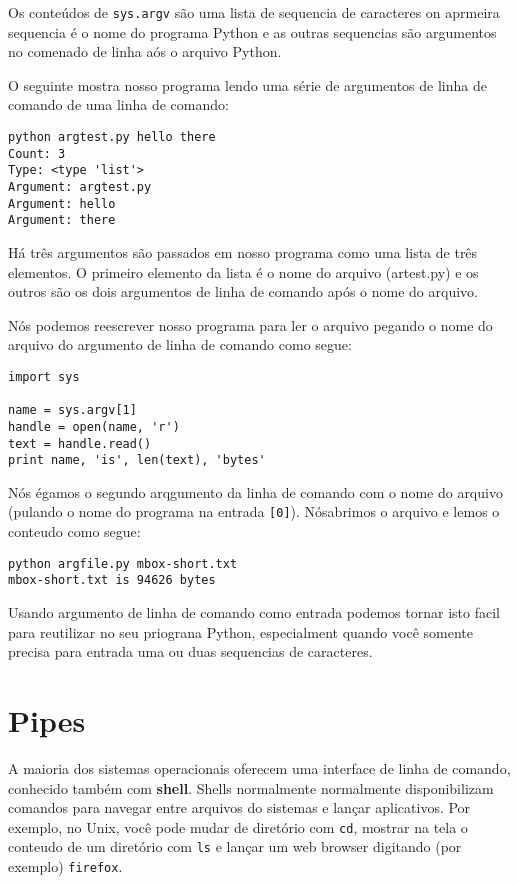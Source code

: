 \documentclass{book}
\begin{document}
%

Os conteúdos de {\tt sys.argv} são uma lista de sequencia de caracteres on aprmeira sequencia 
é o nome do programa Python e as outras sequencias são argumentos no comenado de linha aós o arquivo Python.

O seguinte mostra nosso programa lendo uma série de argumentos de linha de comando de uma linha de comando:

\begin{verbatim}
python argtest.py hello there
Count: 3
Type: <type 'list'>
Argument: argtest.py
Argument: hello
Argument: there
\end{verbatim}
%

Há três argumentos são passados em nosso programa como uma lista de três elementos. 
O primeiro elemento da lista é o nome do arquivo (artest.py) e os outros são
os dois argumentos de linha de comando após o nome do arquivo.

Nós podemos reescrever nosso programa para ler o arquivo pegando o nome do arquivo
do argumento de linha de comando como segue:

\begin{verbatim}
import sys

name = sys.argv[1]
handle = open(name, 'r')
text = handle.read()
print name, 'is', len(text), 'bytes'
\end{verbatim}

%
Nós égamos o segundo arqgumento da linha de comando com o nome do arquivo (pulando o nome do programa na entrada  {\tt [0]}).
Nósabrimos o arquivo e lemos o conteudo como segue:

\begin{verbatim}
python argfile.py mbox-short.txt
mbox-short.txt is 94626 bytes
\end{verbatim}

%
Usando argumento de linha de comando como entrada podemos tornar isto facil para reutilizar no seu priograna Python,
especialment quando você somente precisa para entrada uma ou duas sequencias de caracteres.

\section{Pipes}


A maioria dos sistemas operacionais oferecem uma interface de linha de comando,
conhecido também com {\bf shell}. Shells normalmente normalmente disponibilizam comandos para
navegar entre arquivos do sistemas e lançar aplicativos. Por exemplo, no Unix, você pode mudar de diretório
com {\tt cd}, mostrar na tela o conteudo de um diretório com {\tt ls} e lançar um web browser digitando (por exemplo)
{\tt firefox}.
\end{document}
